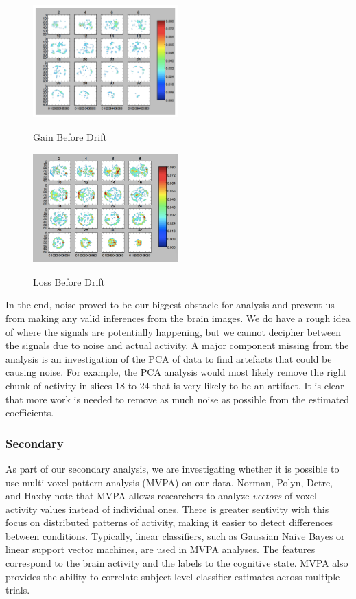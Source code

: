 \documentclass[11pt]{article}
\begin{document}
\begin{figure}[h]
\caption{Gain Before Drift}
\centering
\includegraphics[width=0.5\textwidth]{gain-before-drift.png}
\label{fig:gain-before-drift}
\end{figure}

\begin{figure}[h]
\caption{Loss Before Drift}
\centering
\includegraphics[width=0.5\textwidth]{loss-before-drift.png}
\label{fig:loss-before-drift}
\end{figure}

In the end, noise proved to be our biggest obstacle for analysis and prevent us
from making any valid inferences from the brain images. We do have a rough idea
of where the signals are potentially happening, but we cannot decipher between
the signals due to noise and actual activity. A major component missing from
the analysis is an investigation of the PCA of data to find artefacts that
could be causing noise. For example, the PCA analysis would most likely remove
the right chunk of activity in slices 18 to 24 that is very likely to be an
artifact. It is clear that more work is needed to remove as much noise as
possible from the estimated coefficients.

\subsubsection{Secondary}

As part of our secondary analysis, we are investigating whether it is possible
to use multi-voxel pattern analysis (MVPA) on our data. Norman, Polyn, Detre,
and Haxby note that MVPA allows researchers to analyze \textit{vectors} of
voxel activity values instead of individual ones\cite{norman}. There is greater
sentivity with this focus on distributed patterns of activity, making it easier
to detect differences between conditions\cite{bvmvpa}. Typically, linear
classifiers, such as Gaussian Naive Bayes or linear support vector machines,
are used in MVPA analyses\cite{norman}. The features correspond to the brain
activity and the labels to the cognitive state. MVPA also provides the ability
to correlate subject-level classifier estimates across multiple
trials\cite{norman}.
\end{document}
